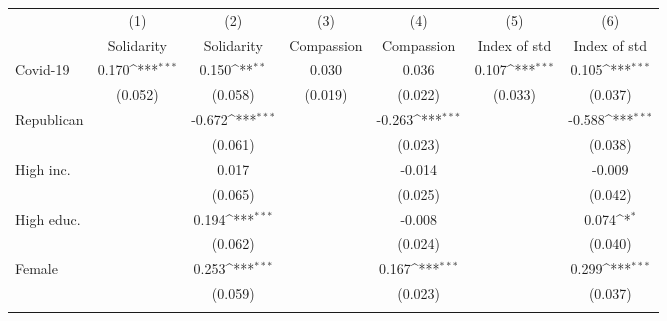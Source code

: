 {
\def\sym#1{\ifmmode^{#1}\else\(^{#1}\)\fi}
\begin{tabular}{l*{6}{c}}
\toprule
                    &\multicolumn{1}{c}{(1)}&\multicolumn{1}{c}{(2)}&\multicolumn{1}{c}{(3)}&\multicolumn{1}{c}{(4)}&\multicolumn{1}{c}{(5)}&\multicolumn{1}{c}{(6)}\\
                    &\multicolumn{1}{c}{Solidarity}&\multicolumn{1}{c}{Solidarity}&\multicolumn{1}{c}{Compassion}&\multicolumn{1}{c}{Compassion}&\multicolumn{1}{c}{Index of std}&\multicolumn{1}{c}{Index of std}\\
\midrule
Covid-19            &       0.170\sym{***}&       0.150\sym{**} &       0.030         &       0.036         &       0.107\sym{***}&       0.105\sym{***}\\
                    &     (0.052)         &     (0.058)         &     (0.019)         &     (0.022)         &     (0.033)         &     (0.037)         \\
\addlinespace
Republican          &                     &      -0.672\sym{***}&                     &      -0.263\sym{***}&                     &      -0.588\sym{***}\\
                    &                     &     (0.061)         &                     &     (0.023)         &                     &     (0.038)         \\
\addlinespace
High inc.           &                     &       0.017         &                     &      -0.014         &                     &      -0.009         \\
                    &                     &     (0.065)         &                     &     (0.025)         &                     &     (0.042)         \\
\addlinespace
High educ.          &                     &       0.194\sym{***}&                     &      -0.008         &                     &       0.074\sym{*}  \\
                    &                     &     (0.062)         &                     &     (0.024)         &                     &     (0.040)         \\
\addlinespace
Female              &                     &       0.253\sym{***}&                     &       0.167\sym{***}&                     &       0.299\sym{***}\\
                    &                     &     (0.059)         &                     &     (0.023)         &                     &     (0.037)         \\
\addlinespace

\end{tabular}}
